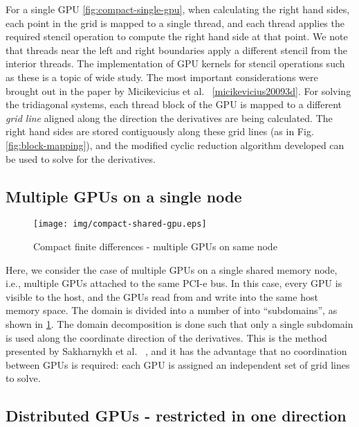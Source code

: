 For a single GPU \ref{fig:compact-single-gpu},
when calculating the right hand sides,
each point in the grid is mapped to a single thread,
and each thread applies the required stencil operation
to compute the right hand side at that point.
We note that threads near the left and right boundaries
apply a different stencil from the interior threads.
The implementation of GPU kernels for
stencil operations such as these is a topic of wide study.
The most important considerations were brought out
in the paper by Micikevicius et al. ~\ref{micikevicius20093d}.
For solving the tridiagonal systems,
each thread block of the GPU is mapped to a
different \emph{grid line}
aligned along the
direction the derivatives are being calculated.
The right hand sides are stored
contiguously along these grid lines
(as in Fig. \ref{fig:block-mapping}),
and the modified cyclic reduction algorithm developed
can be used to solve for the derivatives.

\subsection{Multiple GPUs on a single node}

\begin{figure}
\begin{center}
\texttt{[image: img/compact-shared-gpu.eps]}
\caption{Compact finite differences - multiple GPUs
    on same node}
\label{fig:compact-shared-gpu}
\end{center}
\end{figure}

Here, we consider the case of multiple GPUs
on a single shared memory node, i.e.,
multiple GPUs attached to the same PCI-e bus.
In this case, every GPU is visible to the host,
and the GPUs read from and write into
the same host memory space.
The domain is divided into a number of
into ``subdomains'',
as shown in \ref{fig:compact-shared-gpu}.
The domain decomposition is done such that
only a single subdomain is used along the
coordinate direction of the derivatives.
This is the method presented by
Sakharnykh et al. ~\cite{sakharnykhADIconf},
and it has the advantage that
no coordination between GPUs is required:
each GPU is assigned an independent
set of grid lines to solve.

\subsection{Distributed GPUs - restricted in one direction}

